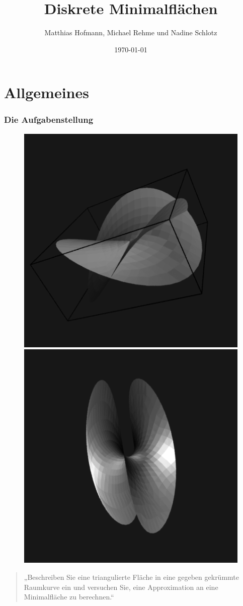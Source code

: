 \documentclass{beamer}
\title{Diskrete Minimalflächen}
\author{Matthias Hofmann, Michael Rehme und Nadine Schlotz}
\date{\today}
\begin{document}
\begin{frame}
	\titlepage
\end{frame}

\section{Allgemeines}

\begin{frame}
	\frametitle{Die Aufgabenstellung}
	\begin{figure}
	\includegraphics[scale=0.2]{Schneiden.png} \hspace{1cm}
	\includegraphics[scale=0.2]{Tennisballkurve.png}
	\end{figure}
	\begin{quote}
		„Beschreiben Sie eine triangulierte Fläche in eine gegeben gekrümmte Raumkurve ein und versuchen Sie, eine Approximation an eine Minimalfläche zu berechnen.“
	\end{quote}
\end{frame}
\end{document}
